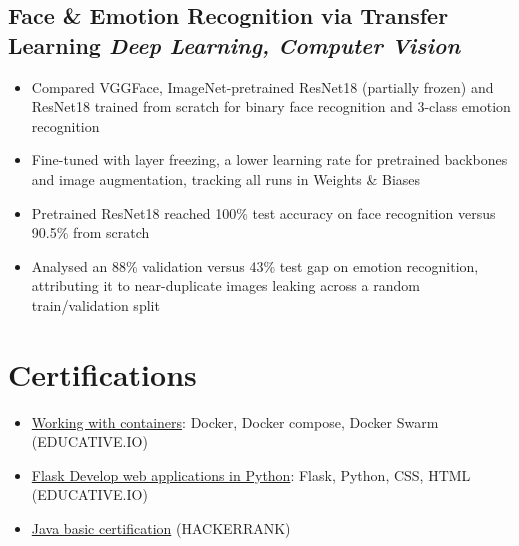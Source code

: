 \documentclass{article}
\newcommand{\itemsize}{\fontsize{11.5pt}{13.5pt}\selectfont}
\begin{document}
\subsection*{Face \& Emotion Recognition via Transfer Learning \hfill {\normalfont\itshape\small Deep Learning, Computer Vision}}

\noindent{}

\begin{itemize}[leftmargin=15pt, topsep=0pt, itemsep=2pt]
    \item {\itemsize Compared VGGFace, ImageNet-pretrained ResNet18 (partially frozen) and ResNet18 trained from scratch for binary face recognition and 3-class emotion recognition}
    \item {\itemsize Fine-tuned with layer freezing, a lower learning rate for pretrained backbones and image augmentation, tracking all runs in Weights \& Biases}
    \item {\itemsize Pretrained ResNet18 reached 100\% test accuracy on face recognition versus 90.5\% from scratch}
    \item {\itemsize Analysed an 88\% validation versus 43\% test gap on emotion recognition, attributing it to near-duplicate images leaking across a random train/validation split}
\end{itemize}
\section*{Certifications}
\begin{itemize}
	\item \href{https://www.educative.io/verify-certificate/Y5xyKBov0ppTp41gXrqlx5c3LGP7RAWBVHJ}{Working with containers}: Docker, Docker compose, Docker Swarm (EDUCATIVE.IO)
	\item \href{https://www.educative.io/verify-certificate/j2l3BzfZ3O94zqGqKSjXR9PNLqr7uA}{Flask Develop web applications in Python}: Flask, Python, CSS, HTML (EDUCATIVE.IO)
	\item \href{https://www.hackerrank.com/certificates/388867dc0d5f}{Java basic certification} (HACKERRANK)
\end{itemize}
\end{document}
